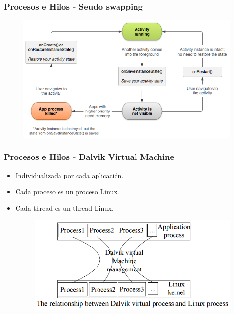 \begin{frame}
  \frametitle{Procesos e Hilos - Seudo swapping}
  \begin{figure}
      \centering
      \includegraphics[scale=0.5]{images/restore-instance.png}
  \end{figure}
\end{frame}

\begin{frame}
  \frametitle{Procesos e Hilos - Dalvik Virtual Machine}
  \begin{itemize}
      \item Individualizada por cada aplicación.
      
      \item Cada proceso es un proceso Linux.
      
      \item Cada thread es un thread Linux.
      
      \begin{figure}
  \centering
  \includegraphics[scale=0.3]{images/dvm-linux-processes.png}
      \end{figure}
  \end{itemize}
\end{frame}

